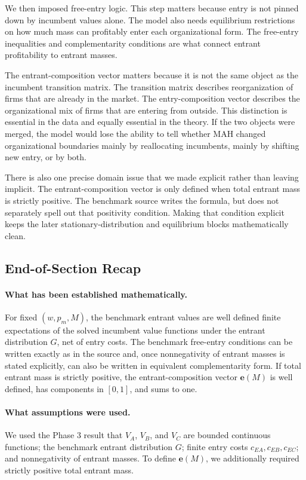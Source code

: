 We then imposed free-entry logic. This step matters because entry is not pinned down by incumbent values alone. The model also needs equilibrium restrictions on how much mass can profitably enter each organizational form. The free-entry inequalities and complementarity conditions are what connect entrant profitability to entrant masses.

The entrant-composition vector matters because it is not the same object as the incumbent transition matrix. The transition matrix describes reorganization of firms that are already in the market. The entry-composition vector describes the organizational mix of firms that are entering from outside. This distinction is essential in the data and equally essential in the theory. If the two objects were merged, the model would lose the ability to tell whether MAH changed organizational boundaries mainly by reallocating incumbents, mainly by shifting new entry, or by both.

There is also one precise domain issue that we made explicit rather than leaving implicit. The entrant-composition vector is only defined when total entrant mass is strictly positive. The benchmark source writes the formula, but does not separately spell out that positivity condition. Making that condition explicit keeps the later stationary-distribution and equilibrium blocks mathematically clean.

\subsection{End-of-Section Recap}

\paragraph{What has been established mathematically.}
For fixed $(w,p_m,M)$, the benchmark entrant values are well defined finite expectations of the solved incumbent value functions under the entrant distribution $G$, net of entry costs. The benchmark free-entry conditions can be written exactly as in the source and, once nonnegativity of entrant masses is stated explicitly, can also be written in equivalent complementarity form. If total entrant mass is strictly positive, the entrant-composition vector $\mathbf e(M)$ is well defined, has components in $[0,1]$, and sums to one.

\paragraph{What assumptions were used.}
We used the Phase 3 result that $V_A$, $V_B$, and $V_C$ are bounded continuous functions; the benchmark entrant distribution $G$; finite entry costs $c_{EA},c_{EB},c_{EC}$; and nonnegativity of entrant masses. To define $\mathbf e(M)$, we additionally required strictly positive total entrant mass.

